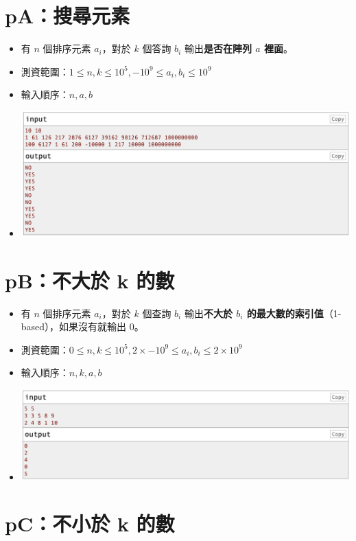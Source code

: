 \documentclass[12pt]{article}
\begin{document}
\section*{pA：搜尋元素}

\begin{itemize}[label={}, itemsep=0pt]
    \item 有 $n$ 個排序元素 $a_i$，對於 $k$ 個答詢 $b_i$ 輸出\textbf{是否在陣列 $a$ 裡面}。
    \item 測資範圍：$1 \leq n, k \leq 10^5, -10^9 \leq a_i, b_i \leq 10^9$
    \item 輸入順序：$n, a, b$
    \item \includegraphics[width=15.0cm]{img/pA.png}
\end{itemize}

\section*{pB：不大於 k 的數}

\begin{itemize}[label={}, itemsep=0pt]
    \item 有 $n$ 個排序元素 $a_i$，對於 $k$ 個查詢 $b_i$ 輸出\textbf{不大於 $b_i$ 的最大數的索引值}（1-based），如果沒有就輸出 $0$。
    \item 測資範圍：$0 \leq n, k \leq 10^5, 2 \times -10^9 \leq a_i, b_i \leq 2 \times 10^9$
    \item 輸入順序：$n, k, a, b$
    \item \includegraphics[width=15.0cm]{img/pB.png}
\end{itemize}

\section*{pC：不小於 k 的數}
\end{document}
